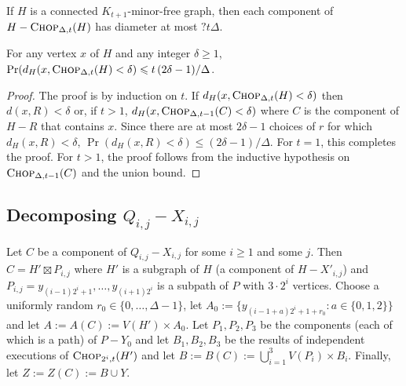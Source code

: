 \documentclass{patmorin}
\renewcommand{\ge}{\geqslant}
\renewcommand{\le}{\leqslant}
\newcommand{\defin}[1]{\emph{\textcolor{brightmaroon}{#1}}}
\begin{document}
\begin{lem}\label{component_diameter_h}
  If $H$ is a connected $K_{t+1}$-minor-free graph, then each component of $H-\textsc{Chop}_{\Delta,t}(H)$ has diameter at most $?t\Delta$.
\end{lem}



\begin{lem}\label{delta_bad_h}
  For any vertex $x$ of $H$ and any integer $\delta\ge 1$, $\Pr(d_H(x, \textsc{Chop}_{\Delta,t}(H)< \delta)\le t\,(2\delta-1)/\Delta$.
\end{lem}

\begin{proof}
  The proof is by induction on $t$.
  If $d_H(x,\textsc{Chop}_{\Delta,t}(H) < \delta)$ then $d(x,R)< \delta$ or, if $t>1$,  $d_H(x,\textsc{Chop}_{\Delta,t-1}(C) < \delta)$ where $C$ is the component of $H-R$ that contains $x$.  Since there are at most $2\delta-1$ choices of $r$ for which $d_H(x,R)<\delta$, $\Pr(d_H(x,R)<\delta) \le (2\delta-1)/\Delta$. For $t=1$, this completes the proof.  For $t>1$, the proof follows from the inductive hypothesis on $\textsc{Chop}_{\Delta,t-1}(C)$ and the union bound.
\end{proof}

\subsection{\boldmath Decomposing $Q_{i,j}-X_{i,j}$}

Let $C$ be a component of $Q_{i,j}-X_{i,j}$ for some $i\ge 1$ and some $j$.  Then $C=H'\boxtimes P_{i,j}$ where $H'$ is a subgraph of $H$ (a component of $H-X'_{i,j}$) and $P_{i,j}=y_{(i-1)2^i+1},\ldots,y_{(i+1)2^i}$ is a subpath of $P$ with $3\cdot2^i$ vertices.  Choose a uniformly random $r_0\in\{0,\ldots,\Delta-1\}$, let $A_0:=\{y_{(i-1+a)2^i+1+r_0}: a\in\{0,1,2\}\}$ and let $A:=A(C):=V(H')\times A_0$.  Let $P_1,P_2,P_3$ be the components (each of which is a path) of $P-Y_0$ and let $B_1,B_2,B_3$ be the results of independent executions of $\textsc{Chop}_{2^i,t}(H')$ and let $B:=B(C):=\bigcup_{i=1}^3 V(P_i)\times B_i$.  Finally, let $Z:=Z(C):=B\cup Y$.

\end{document}
